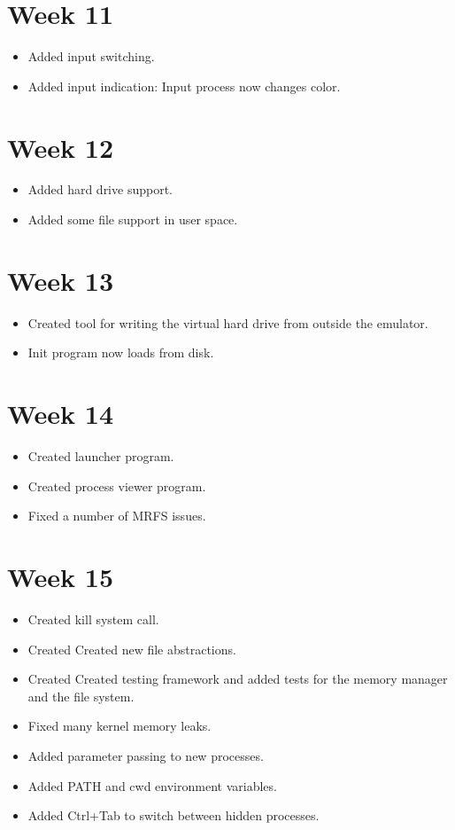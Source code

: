 \documentclass[a4paper]{report}
\begin{document}
\section*{Week 11}
\begin{itemize}
\item Added input switching.
\item Added input indication: Input process now changes color.
\end{itemize}

\section*{Week 12}
\begin{itemize}
\item Added hard drive support.
\item Added some file support in user space.

\end{itemize}

\section*{Week 13}
\begin{itemize}
\item Created tool for writing the virtual hard drive from outside the emulator.
\item Init program now loads from disk.
\end{itemize}

\section*{Week 14}
\begin{itemize}
\item Created launcher program.
\item Created process viewer program.
\item Fixed a number of MRFS issues.
\end{itemize}

\section*{Week 15}
\begin{itemize}
\item Created kill system call.
\item Created Created new file abstractions.
\item Created Created testing framework and added tests for the memory manager and the file system.
\item Fixed many kernel memory leaks.
\item Added parameter passing to new processes.
\item Added PATH and cwd environment variables.
\item Added Ctrl+Tab to switch between hidden processes.
\end{itemize}
\end{document}
